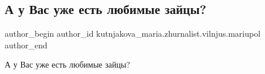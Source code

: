  
 
 
 
 

\subsection{А у Вас уже есть любимые зайцы?}
\label{sec:28_04_2019.fb.kutnjakova_maria.zhurnalist.vilnjus.mariupol.1.ljubimye_zajcy}

\ifcmt
 author_begin
   author_id kutnjakova_maria.zhurnalist.vilnjus.mariupol
 author_end
\fi

А у Вас уже есть любимые зайцы?

